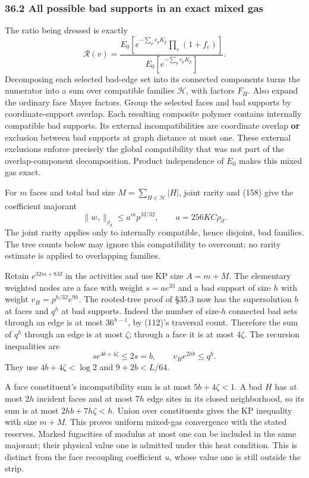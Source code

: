 \documentclass[11pt,a4paper]{article}
\begin{document}
\hypertarget{all-possible-bad-supports-in-an-exact-mixed-gas}{%
\subsubsection{36.2 All possible bad supports in an exact mixed
gas}\label{all-possible-bad-supports-in-an-exact-mixed-gas}}

The ratio being dressed is exactly \[\mathcal R(v)=
 \frac{E_0[e^{-\sum_pv_pK_p}\prod_e(1+f_e)]}
      {E_0[e^{-\sum_pv_pK_p}]}.
\] Decomposing each selected bad-edge set into its connected components
turns the numerator into a sum over compatible families \(\mathcal H\),
with factors \(F_H\). Also expand the ordinary face Mayer factors. Group
the selected faces and bad supports by coordinate-support overlap. Each
resulting composite polymer contains internally compatible bad supports.
Its external incompatibilities are coordinate overlap \textbf{or}
exclusion between bad supports at graph distance at most one. These
external exclusions enforce precisely the global compatibility that was
not part of the overlap-component decomposition. Product independence of
\(E_0\) makes this mixed gas exact.

For \(m\) faces and total bad size \(M=\sum_{H\in\mathcal H}|H|\), joint
rarity and (158) give the coefficient majorant
\[\|w_\gamma\|_{\rho_d}\le a^m p^{M/32},
\qquad a=256KC\rho_d.\tag{168}\] The joint rarity applies only to
internally compatible, hence disjoint, bad families. The tree counts
below may ignore this compatibility to overcount; no rarity estimate is
applied to overlapping families.

Retain \(e^{32m+8M}\) in the activities and use KP size \(A=m+M\). The
elementary weighted nodes are a face with weight \(s=ae^{33}\) and a bad
support of size \(h\) with weight \(v_H=p^{h/32}e^{9h}\). The
rooted-tree proof of §35.3 now has the supersolution \(b\) at faces and
\(q^h\) at bad supports. Indeed the number of size-\(h\) connected bad
sets through an edge is at most \(36^{h-1}\), by (112)'s traversal
count. Therefore the sum of \(q^h\) through an edge is at most
\(\zeta\); through a face it is at most \(4\zeta\). The recursion
inequalities are \[s e^{4b+4\zeta}\le2s=b,\qquad
v_H e^{2hb}\le q^h.\tag{169}\] They use \(4b+4\zeta<\log2\) and
\(9+2b<L/64\).

A face constituent's incompatibility sum is at most \(5b+4\zeta<1\). A
bad \(H\) has at most \(2h\) incident faces and at most \(7h\) edge
sites in its closed neighborhood, so its sum is at most
\(2hb+7h\zeta<h\). Union over constituents gives the KP inequality with
size \(m+M\). This proves uniform mixed-gas convergence with the stated
reserves. Marked fugacities of modulus at most one can be included in
the same majorant; their physical value one is admitted under this heat
condition. This is distinct from the face recoupling coefficient \(u\),
whose value one is still outside the strip.
\end{document}
